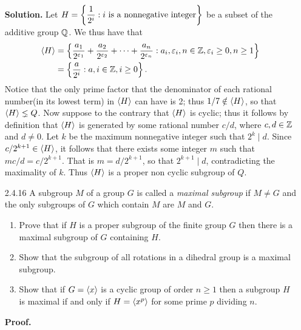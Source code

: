 \begin{enumerate}
      \textbf{Solution.} Let $H = \left\{\displaystyle\frac{1}{2^i} : i \text{ is a 
      nonnegative integer}\right\}$ be a subset of the additive group $\mathbb{Q}$.
      We thus have that
      \begin{align*}
         \langle H \rangle &= \left\{\frac{a_1}{2^{\varepsilon_1}} +
            \frac{a_2}{2^{\varepsilon_2}} + \cdots +
            \frac{a_n}{2^{\varepsilon_n}} : a_i, \varepsilon_i, n \in \mathbb{Z}, 
            \varepsilon_i \ge 0, n \ge 1 \right\} \\
                 &= \left\{\frac{a}{2^i} : a, i \in \mathbb{Z}, i \ge 0\right\}.
      \end{align*}
      Notice that the only prime factor that the denominator of each rational
      number(in its lowest term) in $\langle H \rangle$ can have is 2; thus
      $1/7 \notin \langle H \rangle$, so that $\langle H \rangle \lneq Q$. Now suppose to the
      contrary that $\langle H \rangle$ is cyclic; thus it follows by definition that
      $\langle H \rangle$ is generated by some rational number $c/d$, where $c, d \in \mathbb{Z}$
      and $d \neq 0$. Let $k$ be the maximum nonnegative integer such that
      $2^k \mid d$. Since $c/2^{k+1} \in \langle H \rangle$, it follows that there exists
      some integer $m$ such that $mc/d = c/2^{k+1}$. That is $m = d / 2^{k+1}$,
      so that $2^{k+1} \mid d$, contradicting the maximality of $k$. Thus
      $\langle H \rangle$ is a proper non cyclic subgroup of $Q$.
   \item[2.4.16]  A subgroup $M$ of a group $G$ is called a
                  \textit{maximal subgroup} if $M \neq G$ and the only subgroups
                  of $G$ which contain $M$ are $M$ and $G$.
                  \begin{enumerate}
                     \item Prove that if $H$ is a proper subgroup of the finite
                           group $G$ then there is a maximal subgroup of $G$
                           containing $H$.
                     \item Show that the subgroup of all rotations in a dihedral
                           group is a maximal subgroup.
                     \item Show that if $G = \langle x \rangle$ is a cyclic group of order
                           $n \ge 1$ then a subgroup $H$ is maximal if and only
                           if $H = \langle x^p \rangle$ for some prime $p$ dividing $n$.
                  \end{enumerate}

      \textbf{Proof.}


\end{enumerate}
